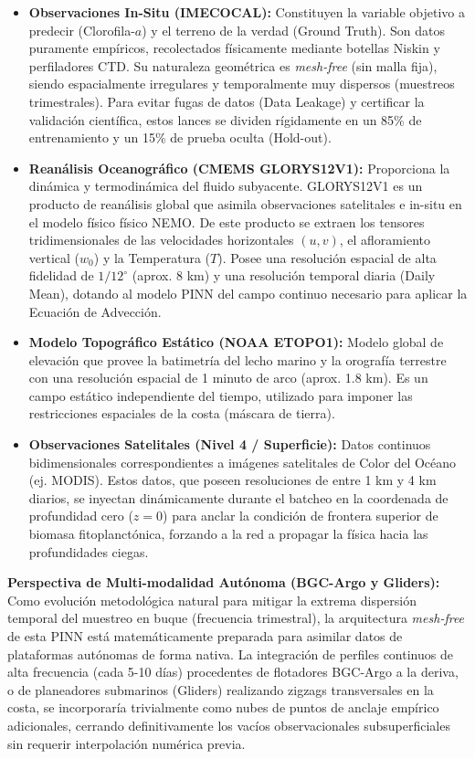 \documentclass[11pt,a4paper]{article}
\begin{document}
\begin{itemize}
    \item \textbf{Observaciones In-Situ (IMECOCAL):} Constituyen la variable objetivo a predecir (Clorofila-$a$) y el terreno de la verdad (Ground Truth). Son datos puramente empíricos, recolectados físicamente mediante botellas Niskin y perfiladores CTD. Su naturaleza geométrica es \textit{mesh-free} (sin malla fija), siendo espacialmente irregulares y temporalmente muy dispersos (muestreos trimestrales). Para evitar fugas de datos (Data Leakage) y certificar la validación científica, estos lances se dividen rígidamente en un 85\% de entrenamiento y un 15\% de prueba oculta (Hold-out).
    
    \item \textbf{Reanálisis Oceanográfico (CMEMS GLORYS12V1):} Proporciona la dinámica y termodinámica del fluido subyacente. GLORYS12V1 es un producto de reanálisis global que asimila observaciones satelitales e in-situ en el modelo físico físico NEMO. De este producto se extraen los tensores tridimensionales de las velocidades horizontales $(u, v)$, el afloramiento vertical ($w_0$) y la Temperatura ($T$). Posee una resolución espacial de alta fidelidad de $1/12^\circ$ (aprox. 8 km) y una resolución temporal diaria (Daily Mean), dotando al modelo PINN del campo continuo necesario para aplicar la Ecuación de Advección.
    
    \item \textbf{Modelo Topográfico Estático (NOAA ETOPO1):} Modelo global de elevación que provee la batimetría del lecho marino y la orografía terrestre con una resolución espacial de 1 minuto de arco (aprox. 1.8 km). Es un campo estático independiente del tiempo, utilizado para imponer las restricciones espaciales de la costa (máscara de tierra).
    
    \item \textbf{Observaciones Satelitales (Nivel 4 / Superficie):} Datos continuos bidimensionales correspondientes a imágenes satelitales de Color del Océano (ej. MODIS). Estos datos, que poseen resoluciones de entre 1 km y 4 km diarios, se inyectan dinámicamente durante el batcheo en la coordenada de profundidad cero ($z=0$) para anclar la condición de frontera superior de biomasa fitoplanctónica, forzando a la red a propagar la física hacia las profundidades ciegas.
\end{itemize}

\textbf{Perspectiva de Multi-modalidad Autónoma (BGC-Argo y Gliders):} Como evolución metodológica natural para mitigar la extrema dispersión temporal del muestreo en buque (frecuencia trimestral), la arquitectura \textit{mesh-free} de esta PINN está matemáticamente preparada para asimilar datos de plataformas autónomas de forma nativa. La integración de perfiles continuos de alta frecuencia (cada 5-10 días) procedentes de flotadores BGC-Argo a la deriva, o de planeadores submarinos (Gliders) realizando zigzags transversales en la costa, se incorporaría trivialmente como nubes de puntos de anclaje empírico adicionales, cerrando definitivamente los vacíos observacionales subsuperficiales sin requerir interpolación numérica previa.
\end{document}
